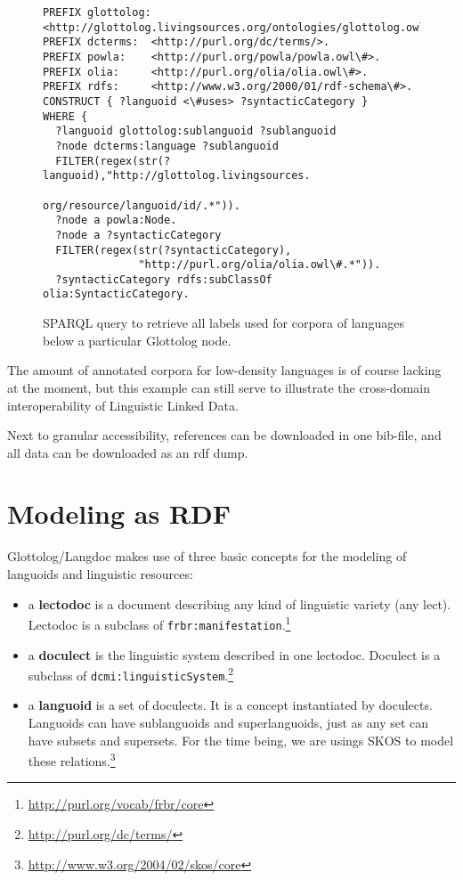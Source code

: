 \documentclass[10pt, a4paper]{article}
\begin{document}
 
\begin{figure}
\tiny
\begin{verbatim}
PREFIX glottolog: <http://glottolog.livingsources.org/ontologies/glottolog.owl\#>.
PREFIX dcterms:  <http://purl.org/dc/terms/>.
PREFIX powla:    <http://purl.org/powla/powla.owl\#>.
PREFIX olia:     <http://purl.org/olia/olia.owl\#>.
PREFIX rdfs:     <http://www.w3.org/2000/01/rdf-schema\#>.
CONSTRUCT { ?languoid <\#uses> ?syntacticCategory }
WHERE {
  ?languoid glottolog:sublanguoid ?sublanguoid
  ?node dcterms:language ?sublanguoid
  FILTER(regex(str(?languoid),"http://glottolog.livingsources.
                                 org/resource/languoid/id/.*")).
  ?node a powla:Node.
  ?node a ?syntacticCategory
  FILTER(regex(str(?syntacticCategory),
               "http://purl.org/olia/olia.owl\#.*")).
  ?syntacticCategory rdfs:subClassOf olia:SyntacticCategory. 
\end{verbatim}
\caption{SPARQL query to retrieve all labels used for corpora of languages below a particular Glottolog node.}
\label{fig:sparql}
\end{figure}

The amount of annotated corpora for low-density languages is of course lacking at the moment, but this example can still serve to illustrate the cross-domain interoperability of Linguistic Linked Data.

Next to granular accessibility, references can be downloaded in one bib-file, and all data can be downloaded as an rdf dump.

\section{Modeling as RDF}
Glottolog/Langdoc makes use of three basic concepts for the modeling of languoids and linguistic resources:

\begin{itemize}
 \item a \textbf{lectodoc} is a document describing any kind of linguistic variety (any lect). Lectodoc is a subclass of \texttt{frbr:manifestation}.\footnote{\url{http://purl.org/vocab/frbr/core}}
 \item a \textbf{doculect} is the linguistic system described in one lectodoc. Doculect is a subclass of \texttt{dcmi:linguisticSystem}.\footnote{\url{http://purl.org/dc/terms/}}
 \item a \textbf{languoid} is a set of doculects. It is a concept instantiated by doculects. Languoids can have sublanguoids and superlanguoids, just as any set can have subsets and supersets. For the time being, we are usings SKOS to model these relations.\footnote{\url{http://www.w3.org/2004/02/skos/core}}
\end{itemize}
\end{document}
